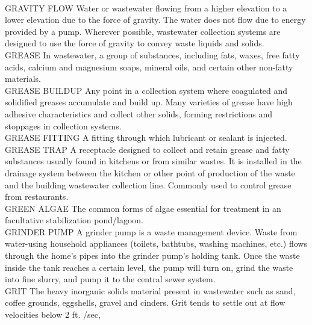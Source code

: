 \documentclass{article}
\begin{document}
\vspace{0.3cm}\\
GRAVITY FLOW
Water or wastewater flowing from a higher elevation to a lower elevation due to the force of gravity. The water does not flow due to energy provided by a pump. Wherever possible, wastewater collection systems are designed to use the force of gravity to convey waste liquids and solids. 
\vspace{0.3cm}\\
GREASE
In wastewater, a group of substances, including fats, waxes, free fatty acids, calcium and magnesium soaps, mineral oils, and certain other non-fatty materials.
\vspace{0.3cm}\\
GREASE BUILDUP
Any point in a collection system where coagulated and solidified greases accumulate and build up. Many varieties of grease have high adhesive characteristics and collect other solids, forming restrictions and stoppages in collection systems. 
\vspace{0.3cm}\\
GREASE FITTING
A fitting through which lubricant or sealant is injected.
\vspace{0.3cm}\\
GREASE TRAP
A receptacle designed to collect and retain grease and fatty substances usually found in kitchens or from similar wastes. It is installed in the drainage system between the kitchen or other point of production of the waste and the building wastewater collection line. Commonly used to control grease from restaurants. 
\vspace{0.3cm}\\
GREEN ALGAE
The common forms of algae essential for treatment in an facultative stabilization pond/lagoon.
\vspace{0.3cm}\\
GRINDER PUMP
A grinder pump is a waste management device. Waste from water-using household appliances (toilets, bathtubs, washing machines, etc.) flows through the home’s pipes into the grinder pump’s holding tank. Once the waste inside the tank reaches a certain level, the pump will turn on, grind the waste into fine slurry, and pump it to the central sewer system.
\vspace{0.3cm}\\
GRIT
The heavy inorganic solids material present in wastewater such as sand, coffee grounds, eggshells, gravel and cinders. Grit tends to settle out at flow velocities below 2 ft. /sec, 
\vspace{0.3cm}\\
\end{document}
